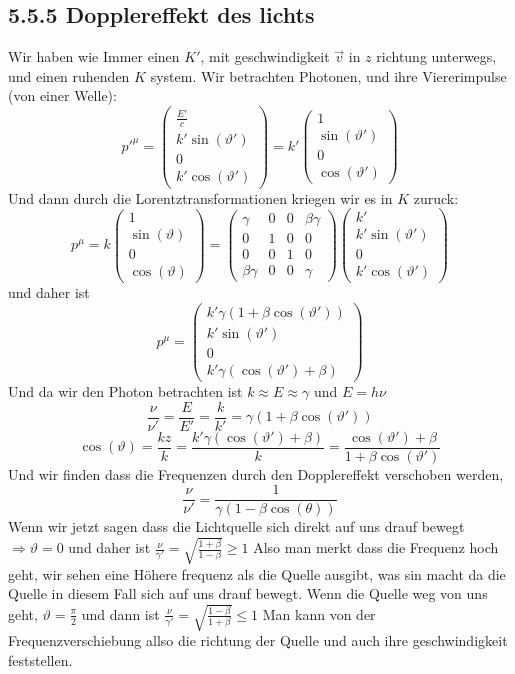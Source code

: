 \documentclass{article}
\begin{document}
\subsection*{5.5.5 Dopplereffekt des lichts}
Wir haben wie Immer einen $K'$, mit geschwindigkeit $\vec{v}$ in $z$ richtung unterwegs, und einen ruhenden $K$ system. Wir betrachten Photonen, und ihre Viererimpulse (von einer Welle):
\[p'^\mu=\begin{pmatrix}\frac{E'}{c}\\k'\sin(\vartheta')\\0\\k'\cos(\vartheta')\end{pmatrix}=k'\begin{pmatrix}1\\\sin(\vartheta')\\0\\\cos(\vartheta')\end{pmatrix}\]
Und dann durch die Lorentztransformationen kriegen wir es in $K$ zuruck:
\[p^\mu=k\begin{pmatrix}1\\\sin(\vartheta)\\0\\\cos(\vartheta)\end{pmatrix}=\begin{pmatrix}\gamma&0&0&\beta\gamma\\0&1&0&0\\0&0&1&0\\\beta\gamma&0&0&\gamma\end{pmatrix}
\begin{pmatrix}k'\\k'\sin(\vartheta')\\0\\k'\cos(\vartheta')\end{pmatrix}\]
und daher ist \[p^\mu=\begin{pmatrix}k' \gamma(1+\beta\cos(\vartheta'))\\k'\sin(\vartheta')\\0\\k'\gamma(\cos(\vartheta')+\beta)\end{pmatrix}\]
Und da wir den Photon betrachten ist $k\approx E\approx \gamma$ und $E=h\nu$ \[\frac{\nu}{\nu'}=\frac{E}{E'}=\frac{k}{k'}=\gamma(1+\beta\cos(\vartheta'))\]
\[\cos(\vartheta)=\frac{kz}{k}=\frac{k'\gamma(\cos(\vartheta')+\beta)}{k}=\frac{\cos(\vartheta')+\beta}{1+\beta\cos(\vartheta')}\]
Und wir finden dass die Frequenzen durch den Dopplereffekt verschoben werden, 
\[\frac{\nu}{\nu'}=\frac{1}{\gamma(1-\beta\cos(\theta))}\] Wenn wir jetzt sagen dass die Lichtquelle sich direkt auf uns drauf bewegt 
$\Longrightarrow \vartheta = 0$ und daher ist $\frac{\nu}{\gamma'}=\sqrt{\frac{1+\beta}{1-\beta}}\ge 1$ Also man merkt dass die Frequenz hoch geht, wir sehen eine Höhere frequenz als die Quelle ausgibt, was sin macht da die Quelle in diesem Fall sich auf uns drauf bewegt.
\newline Wenn die Quelle weg von uns geht, $\vartheta =\frac{\pi}{2}$ und dann ist $\frac{\nu}{\gamma'}=\sqrt{\frac{1-\beta}{1+\beta}}\le 1$ Man kann von der Frequenzverschiebung allso die richtung der Quelle und auch ihre geschwindigkeit feststellen.
\end{document}
